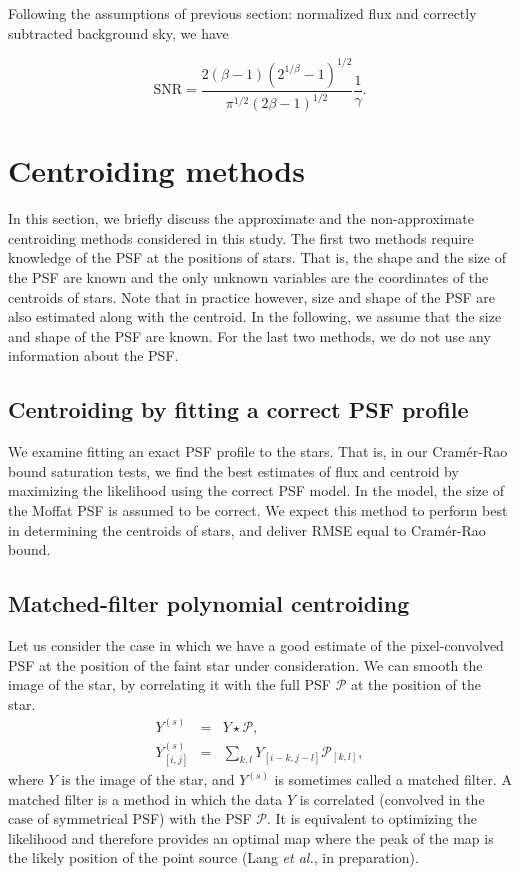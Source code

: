 \documentclass[onecolumn]{aastex61}
\newcommand{\beq}{\begin{equation}}
\newcommand{\eeq}{\end{equation}}
\newcommand{\todo}[1]{{\textcolor{dred}{ #1}}}
\begin{document}
Following the assumptions of previous section: normalized flux and correctly subtracted background sky, we have

\beq
\text{SNR} = \frac{2(\beta-1)(2^{1/\beta}-1)^{1/2}}{\pi^{1/2}(2\beta-1)^{1/2}}\frac{1}{\gamma}.
\label{snr3}
\eeq

\section{Centroiding methods}\label{sec:method}

\todo{In this section, we briefly discuss the approximate and the non-approximate centroiding methods considered in this 
study. The first two methods require knowledge of the PSF at the positions of stars. That is, the shape and the size of the PSF are known and the only unknown variables are the coordinates of the centroids of stars. 
Note that in practice however, size and shape of the PSF are also estimated along with the centroid. In the following, we assume that the size and shape of the PSF are known. For the last two methods, we do not use any information about the PSF.} 

\todo{\subsection{Centroiding by fitting a correct PSF profile}}

We examine fitting an exact PSF profile to the stars. That is, 
in our Cram\'{e}r-Rao bound saturation tests, we find the best
estimates of flux and centroid by maximizing the likelihood using 
the correct PSF model. \todo{In the model, the size of the Moffat PSF is 
assumed to be correct.} We expect this method to perform best in 
determining the centroids of stars, and deliver RMSE equal to 
Cram\'{e}r-Rao bound.


\todo{\subsection{Matched-filter polynomial centroiding}}

Let us consider the case in which we have a good estimate of the pixel-convolved PSF at
the position of the faint star under consideration. 
We can smooth the image of the star, by correlating it with the 
full PSF $\mathcal{P}$ at the position of the star.
\begin{eqnarray}
Y^{(s)} &=& Y \star \mathcal{P}, \\
Y^{(s)}_{[i,j]} &=& \sum_{k,l}Y_{[i-k,j-l]}\mathcal{P}_{[k,l]},
\end{eqnarray}
where $Y$ is the image of the star, and $Y^{(s)}$ is sometimes called a matched filter. 
A matched filter is a method in which the data $Y$ is correlated (convolved in the 
case of symmetrical PSF) with the PSF $\mathcal{P}$. It is equivalent to optimizing the 
likelihood and therefore provides an optimal map 
where the peak of the map is the likely position of the 
point source (Lang \emph{et al.}, in preparation).
\end{document}
